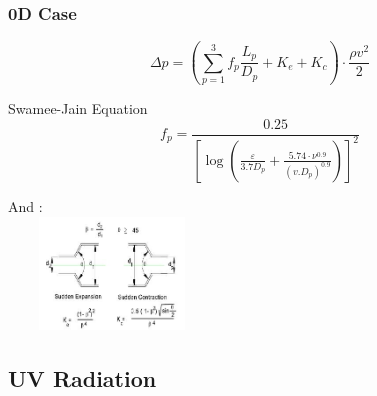 \documentclass[xcolor=dvipsnames,10pt]{beamer}
\begin{document}
  \begin{frame}
  \frametitle{0D Case}
          \begin{equation}
                  \Delta p = \left(\sum_{p=1}^3 f_p\frac{L_p}{D_p} + K_e + K_c\right)\cdot \frac{\rho v^2}{2}
          \end{equation}
  \begin{block}{Swamee-Jain Equation}
  \begin{equation}
          f_p = \frac{0.25}{[\log (\frac{\varepsilon}{3.7 D_p} + \frac{5.74\cdot \nu^{0.9}}{(v.D_p)^{0.9}})]^2}
  \end{equation}
  \end{block}
  And : \\
  \hspace{20mm}
  \includegraphics[height=30mm, width=5.5cm]{./images/fitting.JPG}
  \end{frame}





  \subsection{UV Radiation}
\end{document}
